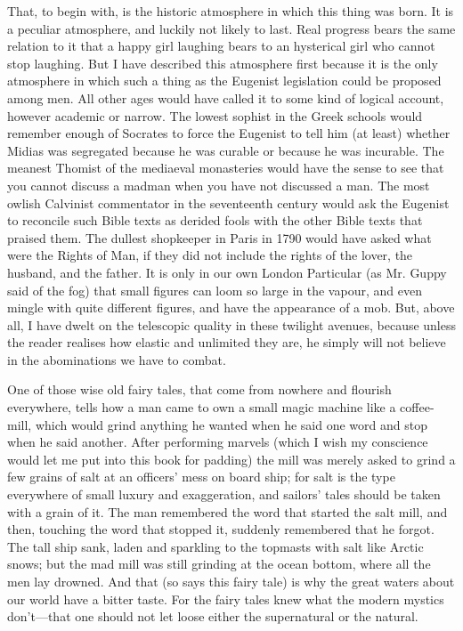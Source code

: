 \documentclass{book}
\begin{document}
That, to begin with, is the historic atmosphere in which this thing was born. It is a peculiar atmosphere, and luckily not likely to last. Real progress bears the same relation to it that a happy girl laughing bears to an hysterical girl who cannot stop laughing. But I have described this atmosphere first because it is the only atmosphere in which such a thing as the Eugenist legislation could be proposed among men. All other ages would have called it to some kind of logical account, however academic or narrow. The lowest sophist in the Greek schools would remember enough of Socrates to force the Eugenist to tell him (at least) whether Midias was segregated because he was curable or because he was incurable. The meanest Thomist of the mediaeval monasteries would have the sense to see that you cannot discuss a madman when you have not discussed a man. The most owlish Calvinist commentator in the seventeenth century would ask the Eugenist to reconcile such Bible texts as derided fools with the other Bible texts that praised them. The dullest shopkeeper in Paris in 1790 would have asked what were the Rights of Man, if they did not include the rights of the lover, the husband, and the father. It is only in our own London Particular (as Mr. Guppy said of the fog) that small figures can loom so large in the vapour, and even mingle with quite different figures, and have the appearance of a mob. But, above all, I have dwelt on the telescopic quality in these twilight avenues, because unless the reader realises how elastic and unlimited they are, he simply will not believe in the abominations we have to combat.

One of those wise old fairy tales, that come from nowhere and flourish everywhere, tells how a man came to own a small magic machine like a coffee-mill, which would grind anything he wanted when he said one word and stop when he said another. After performing marvels (which I wish my conscience would let me put into this book for padding) the mill was merely asked to grind a few grains of salt at an officers’ mess on board ship; for salt is the type everywhere of small luxury and exaggeration, and sailors’ tales should be taken with a grain of it. The man remembered the word that started the salt mill, and then, touching the word that stopped it, suddenly remembered that he forgot. The tall ship sank, laden and sparkling to the topmasts with salt like Arctic snows; but the mad mill was still grinding at the ocean bottom, where all the men lay drowned. And that (so says this fairy tale) is why the great waters about our world have a bitter taste. For the fairy tales knew what the modern mystics don’t—that one should not let loose either the supernatural or the natural.
\end{document}

